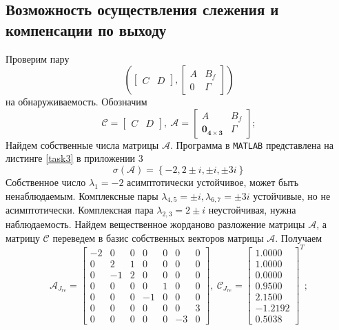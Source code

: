 \documentclass[a4paper, 12pt]{article}
\begin{document}
    \subsection{Возможность осуществления слежения и компенсации по выходу}
    Проверим пару $$\left(\begin{bmatrix}
        C &D
    \end{bmatrix},\begin{bmatrix}
        A &B_f\\
        0 &\Gamma
    \end{bmatrix}\right)$$ на обнаруживаемость. Обозначим
    $$
    \mathcal{C}=\begin{bmatrix}
        C &D
    \end{bmatrix},\ \mathcal{A}=\begin{bmatrix}
        A &B_f\\
        \mathbf{0_{4\times3}} &\Gamma
    \end{bmatrix};
    $$
    Найдем собственные числа матрицы $\mathcal{A}$. Программа в \texttt{MATLAB} представлена на листинге \ref{task3} в приложении 3
    $$
    \sigma\left( \mathcal{A} \right)=\left\{ -2,2\pm i,\pm i, \pm3i \right\}
    $$
    Собственное число $\lambda_1=-2$ асимптотически устойчивое, может быть ненаблюдаемым.
    Комплексные пары $\lambda_{4,5}=\pm i,\lambda_{6,7}=\pm3i$ устойчивые, но не асимптотически.
    Комплексная пара $\lambda_{2,3}=2\pm i$ неустойчивая, нужна наблюдаемость.
    Найдем вещественное жорданово разложение матрицы $\mathcal{A}$,
    а матрицу $\mathcal{C}$ переведем в базис собственных
    векторов матрицы $\mathcal{A}$. Получаем
    $$
    \mathcal{A}_{J_{re}}=\begin{bmatrix}
        -2         &0         &0    &0    &0   &0   &0\\
         0    &2    &1    &0    &0   &0   &0\\
         0   &-1    &2    &0    &0   &0   &0\\
         0         &0         &0         &0    &1         &0         &0\\
         0         &0         &0   &-1         &0         &0         &0\\
         0         &0         &0         &0         &0         &0    &3\\
         0         &0         &0         &0         &0   &-3         &0
    \end{bmatrix},\ \mathcal{C}_{J_{re}}=\begin{bmatrix}
        1.0000\\    1.0000\\         0.0000\\    0.9500\\    2.1500\\   -1.2192\\    0.5038
    \end{bmatrix}^T;
    $$
\end{document}
